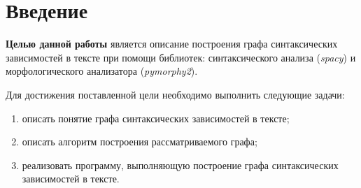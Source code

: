 \chapter*{Введение}

\textbf{Целью данной работы} является описание построения графа синтаксических зависимостей в тексте при помощи библиотек: синтаксического анализа (\textit{spacy}) и морфологического анализатора (\textit{pymorphy2}).

Для достижения поставленной цели необходимо выполнить следующие задачи:
\begin{enumerate}[label=\arabic*)]
	\item описать понятие графа синтаксических зависимостей в тексте;
	\item описать алгоритм построения рассматриваемого графа;
    \item реализовать программу, выполняющую построение графа синтаксических зависимостей в тексте.
\end{enumerate}
